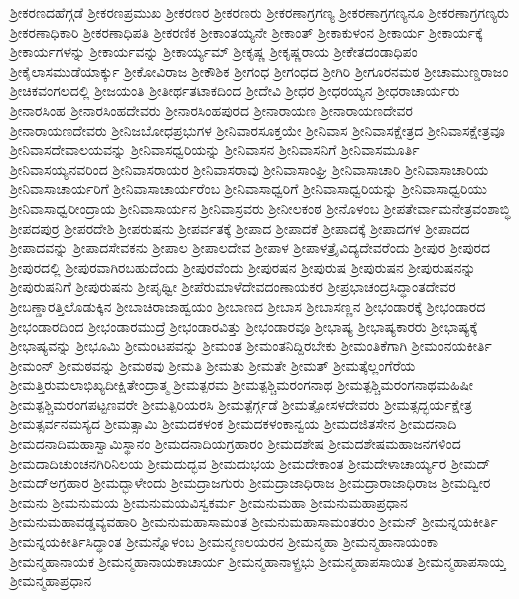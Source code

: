 {ಶ್ರೀಕರಣದಹೆಗ್ಗಡೆ
ಶ್ರೀಕರಣಪ್ರಮುಖ
ಶ್ರೀಕರಣರ
ಶ್ರೀಕರಣರು
ಶ್ರೀಕರಣಾಗ್ರಗಣ್ಯ
ಶ್ರೀಕರಣಾಗ್ರಗಣ್ಯನೂ
ಶ್ರೀಕರಣಾಗ್ರಗಣ್ಯರು
ಶ್ರೀಕರಣಾಧಿಕಾರಿ
ಶ್ರೀಕರಣಾಧಿಪತಿ
ಶ್ರೀಕರಣಿಕ
ಶ್ರೀಕಾಂತಯ್ಯನೇ
ಶ್ರೀಕಾಂತ್
ಶ್ರೀಕಾಕುಳಂನ
ಶ್ರೀಕಾರ್ಯ
ಶ್ರೀಕಾರ್ಯಕ್ಕೆ
ಶ್ರೀಕಾರ್ಯಗಳನ್ನು
ಶ್ರೀಕಾರ್ಯವನ್ನು
ಶ್ರೀಕಾರ್ಯ್ಯಮ್
ಶ್ರೀಕೃಷ್ಣ
ಶ್ರೀಕೃಷ್ಣರಾಯ
ಶ್ರೀಕೇತದಂಡಾಧಿಪಂ
ಶ್ರೀಕೈಲಾಸಮುಡೆಯಾರ್ಕ್ಕು
ಶ್ರೀಕೋವಿರಾಜ
ಶ್ರೀಕೌಶಿಕ
ಶ್ರೀಗಂಧ
ಶ್ರೀಗಂಧದ
ಶ್ರೀಗಿರಿ
ಶ್ರೀಗೂರನಮಠ
ಶ್ರೀಚಾಮುಣ್ಡರಾಜಂ
ಶ್ರೀಚಿಕವಂಗಲದಲ್ಲಿ
ಶ್ರೀಜಯಂತಿ
ಶ್ರೀತೀರ್ಥತಟಾಕದಿಂದ
ಶ್ರೀದೇವಿ
ಶ್ರೀಧರ
ಶ್ರೀಧರಯ್ಯನ
ಶ್ರೀಧರಾಚಾರ್ಯರು
ಶ್ರೀನಾರಸಿಂಹ
ಶ್ರೀನಾರಸಿಂಹದೇವರು
ಶ್ರೀನಾರಸಿಂಹಪುರದ
ಶ್ರೀನಾರಾಯಣ
ಶ್ರೀನಾರಾಯಣದೇವರ
ಶ್ರೀನಾರಾಯಣದೇವರು
ಶ್ರೀನಿಜಬೋಧಪ್ರಭುಗಳ
ಶ್ರೀನಿವಾರಸೂಕ್ತಯೇ
ಶ್ರೀನಿವಾಸ
ಶ್ರೀನಿವಾಸಕ್ಷೇತ್ರದ
ಶ್ರೀನಿವಾಸಕ್ಷೇತ್ರವೂ
ಶ್ರೀನಿವಾಸದೇವಾಲಯವನ್ನು
ಶ್ರೀನಿವಾಸಧ್ವರಿಯನ್ನು
ಶ್ರೀನಿವಾಸನ
ಶ್ರೀನಿವಾಸನಿಗೆ
ಶ್ರೀನಿವಾಸಮೂರ್ತಿ
ಶ್ರೀನಿವಾಸಯ್ಯನವರಿಂದ
ಶ್ರೀನಿವಾಸರಾಯರ
ಶ್ರೀನಿವಾಸರಾವು
ಶ್ರೀನಿವಾಸಾಂಘ್ರಿ
ಶ್ರೀನಿವಾಸಾಚಾರಿ
ಶ್ರೀನಿವಾಸಾಚಾರಿಯ
ಶ್ರೀನಿವಾಸಾಚಾರ್ಯರಿಗೆ
ಶ್ರೀನಿವಾಸಾಚಾರ್ಯರೆಂಬ
ಶ್ರೀನಿವಾಸಾಧ್ವರಿಗೆ
ಶ್ರೀನಿವಾಸಾಧ್ವರಿಯನ್ನು
ಶ್ರೀನಿವಾಸಾಧ್ವರಿಯು
ಶ್ರೀನಿವಾಸಾಧ್ವರೀಂದ್ರಾಯ
ಶ್ರೀನಿವಾಸಾರ್ಯನ
ಶ್ರೀನಿವಾಸ್ರವರು
ಶ್ರೀನೀಲಕಂಠ
ಶ್ರೀನೊಳಂಬ
ಶ್ರೀಪತೇರ್ವಾಮನೇತ್ರವಂಶಾಬ್ಧಿ
ಶ್ರೀಪದಪುರ್ರ
ಶ್ರೀಪರದೇಶಿ
ಶ್ರೀಪರುಷನು
ಶ್ರೀಪರ್ವತಕ್ಕೆ
ಶ್ರೀಪಾದ
ಶ್ರೀಪಾದಕೆ
ಶ್ರೀಪಾದಕ್ಕೆ
ಶ್ರೀಪಾದಗಳ
ಶ್ರೀಪಾದದ
ಶ್ರೀಪಾದವನ್ನು
ಶ್ರೀಪಾದಸೇವಕನು
ಶ್ರೀಪಾಲ
ಶ್ರೀಪಾಲದೇವ
ಶ್ರೀಪಾಳ
ಶ್ರೀಪಾಳತ್ರೈವಿದ್ಯದೇವರೆಂದು
ಶ್ರೀಪುರ
ಶ್ರೀಪುರದ
ಶ್ರೀಪುರದಲ್ಲಿ
ಶ್ರೀಪುರವಾಗಿರಬಹುದೆಂದು
ಶ್ರೀಪುರವೆಂದು
ಶ್ರೀಪುರಷನ
ಶ್ರೀಪುರುಷ
ಶ್ರೀಪುರುಷನ
ಶ್ರೀಪುರುಷನನ್ನು
ಶ್ರೀಪುರುಷನಿಗೆ
ಶ್ರೀಪುರುಷನು
ಶ್ರೀಪೃಥ್ವೀ
ಶ್ರೀಪೆರುಮಾಳೆದೇವದಂಣಾಯಕರ
ಶ್ರೀಪ್ರಭಾಚಂದ್ರಸಿದ್ಧಾಂತದೇವರ
ಶ್ರೀಬಣ್ಡಾರತ್ತಿಲೊಡುಕ್ಕಿನ
ಶ್ರೀಬಾಚಿರಾಜಾಹ್ವಯಂ
ಶ್ರೀಬಾಣದ
ಶ್ರೀಬಾಸ
ಶ್ರೀಬಾಸಣ್ಣನ
ಶ್ರೀಭಂಡಾರಕ್ಕೆ
ಶ್ರೀಭಂಡಾರದ
ಶ್ರೀಭಂಡಾರದಿಂದ
ಶ್ರೀಭಂಡಾರಮುದ್ರೆ
ಶ್ರೀಭಂಡಾರವಿತ್ತು
ಶ್ರೀಭಂಡಾರವೂ
ಶ್ರೀಭಾಷ್ಯ
ಶ್ರೀಭಾಷ್ಯಕಾರರು
ಶ್ರೀಭಾಷ್ಯಕ್ಕೆ
ಶ್ರೀಭಾಷ್ಯವನ್ನು
ಶ್ರೀಭೂಮಿ
ಶ್ರೀಮಂಟಪವನ್ನು
ಶ್ರೀಮಂತ
ಶ್ರೀಮಂತನಿದ್ದಿರಬೇಕು
ಶ್ರೀಮಂತಿಕೆಗಾಗಿ
ಶ್ರೀಮಂನಯಕೀರ್ತಿ
ಶ್ರೀಮಂನ್
ಶ್ರೀಮಠವನ್ನು
ಶ್ರೀಮಠವು
ಶ್ರೀಮತಿ
ಶ್ರೀಮತು
ಶ್ರೀಮತೇ
ಶ್ರೀಮತ್
ಶ್ರೀಮತ್ಕೆಲ್ಲಂಗೆರೆಯ
ಶ್ರೀಮತ್ತಿರುಮಲಾಭಿಖ್ಯದೀಕ್ಷಿತೇಂದ್ರಾತ್ಮ
ಶ್ರೀಮತ್ಪರಮ
ಶ್ರೀಮತ್ಪಶ್ಚಿಮರಂಗನಾಥ
ಶ್ರೀಮತ್ಪಶ್ಚಿಮರಂಗನಾಥಮಹಿಷೀ
ಶ್ರೀಮತ್ಪಶ್ಚಿಮರಂಗಪಟ್ಟಣವರೇ
ಶ್ರೀಮತ್ಪಿರಿಯರಸಿ
ಶ್ರೀಮತ್ಪೆರ್ಗ್ಗಡೆ
ಶ್ರೀಮತ್ಪೋಸಳದೇವರು
ಶ್ರೀಮತ್ಸದ್ಭರ್ಯಕ್ಷೇತ್ರ
ಶ್ರೀಮತ್ಸರ್ವನಮಸ್ಯದ
ಶ್ರೀಮತ್ಸಾಮಿ
ಶ್ರೀಮದಕಳಂಕ
ಶ್ರೀಮದಕಳಂಕಾನ್ವಯ
ಶ್ರೀಮದಜಿತಸೇನ
ಶ್ರೀಮದನಾದಿ
ಶ್ರೀಮದನಾದಿಮಹಾಸ್ವಾಮಿಸ್ಥಾನಂ
ಶ್ರೀಮದನಾದಿಯಗ್ರಹಾರಂ
ಶ್ರೀಮದಶೇಷ
ಶ್ರೀಮದಶೇಷಮಹಾಜನಗಳಿಂದ
ಶ್ರೀಮದಾದಿಚುಂಚನಗಿರಿನಿಲಯ
ಶ್ರೀಮದುದ್ಭವ
ಶ್ರೀಮದುಭಯ
ಶ್ರೀಮದೇಕಾಂತ
ಶ್ರೀಮದೇಳಾಚಾರ್ಯ್ಯರ
ಶ್ರೀಮದ್
ಶ್ರೀಮದ್ಅಗ್ರಹಾರ
ಶ್ರೀಮದ್ಭಾಳೇಂದು
ಶ್ರೀಮದ್ರಾಜಗುರು
ಶ್ರೀಮದ್ರಾಜಾಧಿರಾಜ
ಶ್ರೀಮದ್ರಾರಾಜಾಧಿರಾಜ
ಶ್ರೀಮದ್ವೀರ
ಶ್ರೀಮನು
ಶ್ರೀಮನುಮಯ
ಶ್ರೀಮನುಮಯವಿಸ್ವಕರ್ಮ
ಶ್ರೀಮನುಮಹಾ
ಶ್ರೀಮನುಮಹಾಪ್ರಧಾನ
ಶ್ರೀಮನುಮಹಾವಡ್ಡವ್ಯವಹಾರಿ
ಶ್ರೀಮನುಮಹಾಸಾಮಂತ
ಶ್ರೀಮನುಮಹಾಸಾಮಂತರುಂ
ಶ್ರೀಮನ್
ಶ್ರೀಮನ್ನಯಕೀರ್ತಿ
ಶ್ರೀಮನ್ನಯಕೀರ್ತಿಸಿದ್ಧಾಂತ
ಶ್ರೀಮನ್ನೊಳಂಬ
ಶ್ರೀಮನ್ಮಣಲಯರನ
ಶ್ರೀಮನ್ಮಹಾ
ಶ್ರೀಮನ್ಮಹಾನಾಯಂಕಾ
ಶ್ರೀಮನ್ಮಹಾನಾಯಕ
ಶ್ರೀಮನ್ಮಹಾನಾಯಕಾಚಾರ್ಯ
ಶ್ರೀಮನ್ಮಹಾನಾಳ್ಪ್ರಭು
ಶ್ರೀಮನ್ಮಹಾಪಸಾಯಿತ
ಶ್ರೀಮನ್ಮಹಾಪಸಾಯ್ತ
ಶ್ರೀಮನ್ಮಹಾಪ್ರಧಾನ
}
